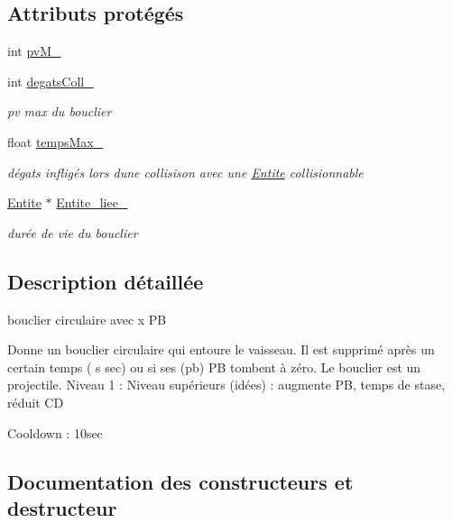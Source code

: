 \subsection*{Attributs protégés}
\begin{DoxyCompactItemize}
\item 
int \hyperlink{class_cap_bouclier_rond_a0dbbf591863880d6c2c46a8b87c5eba5}{pv\+M\+\_\+}
\item 
int \hyperlink{class_cap_bouclier_rond_a82d7dddc7f8857d19d3f3757718e06d7}{degats\+Coll\+\_\+}
\begin{DoxyCompactList}\small\item\em pv max du bouclier \end{DoxyCompactList}\item 
float \hyperlink{class_cap_bouclier_rond_abb59fc2be98b9d69c2fb1a3f832bdb19}{temps\+Max\+\_\+}
\begin{DoxyCompactList}\small\item\em dégats infligés lors d\textquotesingle{}une collisison avec une \hyperlink{class_entite}{Entite} collisionnable \end{DoxyCompactList}\item 
\hyperlink{class_entite}{Entite} $\ast$ \hyperlink{class_cap_bouclier_rond_a6667ab636d8eb5a8ba0b7b0bc0674b4b}{Entite\+\_\+liee\+\_\+}
\begin{DoxyCompactList}\small\item\em durée de vie du bouclier \end{DoxyCompactList}\end{DoxyCompactItemize}


\subsection{Description détaillée}
bouclier circulaire avec x PB 

Donne un bouclier circulaire qui entoure le vaisseau. Il est supprimé après un certain temps ( s sec) ou si ses (pb) PB tombent à zéro. Le bouclier est un projectile. Niveau 1 \+: Niveau supérieurs (idées) \+: augmente PB, temps de stase, réduit CD

Cooldown \+: 10sec 

\subsection{Documentation des constructeurs et destructeur}
\mbox{\label{class_cap_bouclier_rond_aec1b654b05d75943664c3d95ad2407ac}} 

